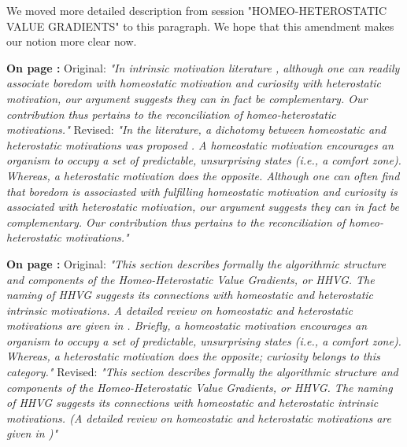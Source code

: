 \documentclass[utf8]{article}
\newenvironment{reply}  
    {\color{Blue}\noindent\newline}
    {\newline}
\newcommand{\revise}[3]{
    \noindent
    \newline
    \textbf{On page {#1}:}\newline
    \newline
    Original:\newline
    \textit{"#2"}
    \newline
    \newline
    Revised:\newline
    \textit{"#3"}\newline}
\begin{document}
        
        \begin{reply}
            We moved more detailed description from session "HOMEO-HETEROSTATIC VALUE GRADIENTS" to this paragraph. We hope that this amendment makes our notion more clear now.
        
            \revise{\pageref{rev:HomoVsHetero}}
                {In intrinsic motivation literature \citep{intrinsicmotiv}, although one can readily associate boredom with homeostatic motivation and curiosity with heterostatic motivation, our argument suggests they can in fact be complementary. Our contribution thus pertains to the reconciliation of homeo-heterostatic motivations.}
                {In the literature, a dichotomy between homeostatic and heterostatic motivations was proposed \citep{intrinsicmotiv}. A homeostatic motivation encourages an organism to occupy a set of predictable, unsurprising states (i.e., a {\it comfort zone}). Whereas, a heterostatic motivation does the opposite. Although one can often find that boredom is associasted with fulfilling homeostatic motivation and curiosity is associated with heterostatic motivation, our argument suggests they can in fact be complementary. Our contribution thus pertains to the reconciliation of homeo-heterostatic motivations.}
                
            \revise{\pageref{rev:HomoVsHetero2}}
                {This section describes formally the algorithmic structure and components of the Homeo-Heterostatic Value Gradients, or HHVG. The naming of HHVG suggests its connections with homeostatic and heterostatic intrinsic motivations. A detailed review on homeostatic and heterostatic motivations are given in \cite{intrinsicmotiv}. Briefly, a homeostatic motivation encourages an organism to occupy a set of predictable, unsurprising states (i.e., a {\it comfort zone}). Whereas, a heterostatic motivation does the opposite; curiosity belongs to this category.}
                {This section describes formally the algorithmic structure and components of the Homeo-Heterostatic Value Gradients, or HHVG. The naming of HHVG suggests its connections with homeostatic and heterostatic intrinsic motivations. (A detailed review on homeostatic and heterostatic motivations are given in \cite{intrinsicmotiv})}

        \end{reply}
        
        
        
\end{document}
